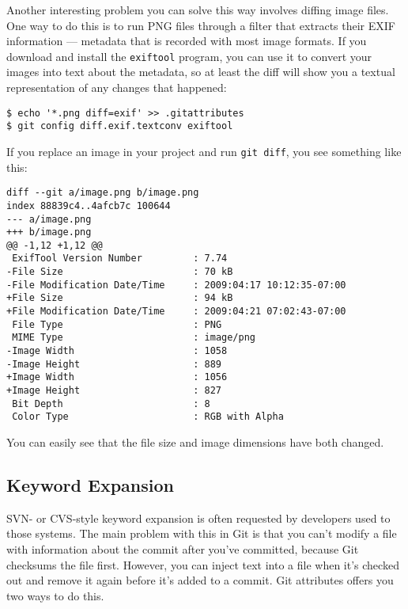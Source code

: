 \documentclass[a4paper]{book}
\begin{document}
Another interesting problem you can solve this way involves diffing image files. One way to do this is to run PNG files through a filter that extracts their EXIF information --- metadata that is recorded with most image formats. If you download and install the \texttt{exiftool} program, you can use it to convert your images into text about the metadata, so at least the diff will show you a textual representation of any changes that happened:

\begin{shaded}\begin{verbatim}
$ echo '*.png diff=exif' >> .gitattributes
$ git config diff.exif.textconv exiftool
\end{verbatim}\end{shaded}

If you replace an image in your project and run \texttt{git diff}, you see something like this:

\begin{shaded}\begin{verbatim}
diff --git a/image.png b/image.png
index 88839c4..4afcb7c 100644
--- a/image.png
+++ b/image.png
@@ -1,12 +1,12 @@
 ExifTool Version Number         : 7.74
-File Size                       : 70 kB
-File Modification Date/Time     : 2009:04:17 10:12:35-07:00
+File Size                       : 94 kB
+File Modification Date/Time     : 2009:04:21 07:02:43-07:00
 File Type                       : PNG
 MIME Type                       : image/png
-Image Width                     : 1058
-Image Height                    : 889
+Image Width                     : 1056
+Image Height                    : 827
 Bit Depth                       : 8
 Color Type                      : RGB with Alpha
\end{verbatim}\end{shaded}

You can easily see that the file size and image dimensions have both changed.

\subsection{Keyword Expansion}\label{keyword-expansion}

SVN- or CVS-style keyword expansion is often requested by developers used to those systems. The main problem with this in Git is that you can't modify a file with information about the commit after you've committed, because Git checksums the file first. However, you can inject text into a file when it's checked out and remove it again before it's added to a commit. Git attributes offers you two ways to do this.
\end{document}
